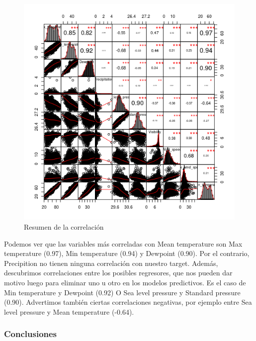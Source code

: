 \begin{figure}[H] %
	\centering
	\includegraphics[scale=0.9]{correlaciones.png}  %
	\caption{Resumen de la correlación} 
	\label{fig:correlaciones}
\end{figure}

Podemos ver que las variables más correladas con Mean temperature son Max temperature (0.97), Min temperature (0.94) y Dewpoint (0.90). Por el contrario, Precipition no tienen ninguna correlación con nuestro target. Además, descubrimos correlaciones entre los posibles regresores, que nos pueden dar motivo luego para eliminar uno u otro en los modelos predictivos. Es el caso de Min temperature y Dewpoint (0.92) O Sea level pressure y Standard pressure (0.90). Advertimos también ciertas correlaciones negativas, por ejemplo entre Sea level pressure y Mean temperature (-0.64). 

\subsubsection{Conclusiones}

